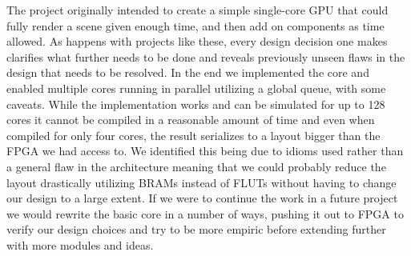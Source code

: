 			The project originally intended to create a simple single-core GPU that
			could fully render a scene given enough time, and then add on components
			as time allowed. As happens with projects like these, every design
			decision one makes clarifies what further needs to be done and reveals
			previously unseen flaws in the design that needs to be resolved. In the
			end we implemented the core and enabled multiple cores running in
			parallel utilizing a global queue, with some caveats. While the
			implementation works and can be simulated for up to 128 cores it cannot
			be compiled in a reasonable amount of time and even when compiled for
			only four cores, the result serializes to a layout bigger than the FPGA
			we had access to. We identified this being due to idioms used rather than
			a general flaw in the architecture meaning that we could probably reduce
			the layout drastically utilizing BRAMs instead of FLUTs without having to
			change our design to a large extent. If we were to continue the work in a
			future project we would rewrite the basic core in a number of ways,
			pushing it out to FPGA to verify our design choices and try to be more
			empiric before extending further with more modules and ideas. 
